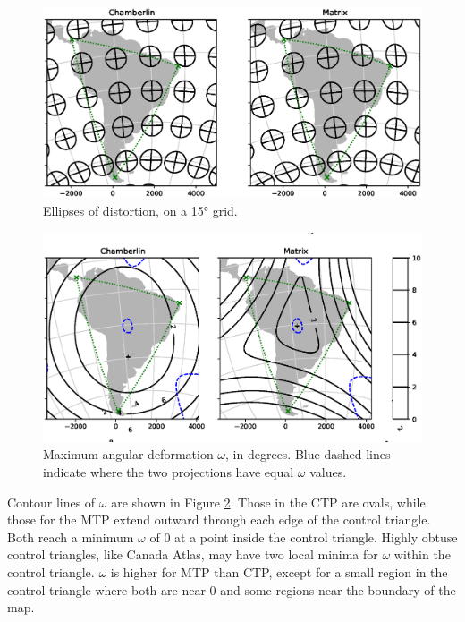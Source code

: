 \documentclass[]{interact}
\begin{document}
\begin{figure}
  \includegraphics[width=\textwidth]{South_America_Wall_Map_tissot}
  \caption{Ellipses of distortion, on a 15° grid.}
  \label{fig:tissot}
\end{figure}

\begin{figure}
  \includegraphics[width=\textwidth]{South_America_Wall_Map_omega}
  \caption{Maximum angular deformation $\omega$, in degrees. Blue dashed lines
  indicate where the two projections have equal $\omega$ values.}
  \label{fig:angle}
\end{figure}

Contour lines of $\omega$ are shown in Figure \ref{fig:angle}. Those in the CTP
are ovals, while those for the MTP extend outward through each edge of the
control triangle. Both reach a minimum $\omega$ of 0 at a point inside the
control triangle. Highly obtuse control triangles, like Canada Atlas, may have
two local minima for $\omega$ within the control triangle. $\omega$ is higher
for MTP than CTP, except for a small region in the control triangle where both
are near 0 and some regions near the boundary of the map.
\end{document}
